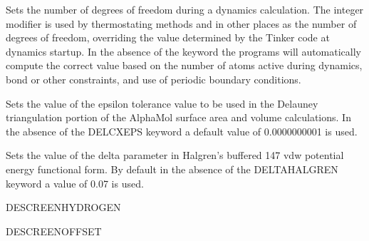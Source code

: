 \documentclass[letterpaper,11pt,english]{sphinxmanual}
\begin{document}
\ignorespaces {}\label{\detokenize{text/keywords:key-degrees-freedom}}\begin{description}
\sphinxAtStartPar
Sets the number of degrees of freedom during a dynamics calculation. The integer modifier is used by thermostating methods and in other places as the number of degrees of freedom, overriding the value determined by the Tinker code at dynamics startup. In the absence of the keyword the programs will automatically compute the correct value based on the number of atoms active during dynamics, bond or other constraints, and use of periodic boundary conditions.

\end{description}

\ignorespaces {}\label{\detokenize{text/keywords:key-delcx-eps}}\begin{description}
\sphinxAtStartPar
Sets the value of the epsilon tolerance value to be used in the Delauney triangulation portion of the AlphaMol surface area and volume calculations. In the absence of the DELCX\sphinxhyphen{}EPS keyword a default value of 0.0000000001 is used.

\end{description}

\ignorespaces {}\label{\detokenize{text/keywords:key-delta-halgren}}\begin{description}
\sphinxAtStartPar
Sets the value of the delta parameter in Halgren’s buffered 14\sphinxhyphen{}7 vdw potential energy functional form. By default in the absence of the DELTA\sphinxhyphen{}HALGREN keyword a value of 0.07 is used.

\end{description}

\ignorespaces {}\label{\detokenize{text/keywords:key-descreen-hydrogen}}
\sphinxAtStartPar
DESCREEN\sphinxhyphen{}HYDROGEN

\ignorespaces {}\label{\detokenize{text/keywords:key-descreen-offset}}
\sphinxAtStartPar
DESCREEN\sphinxhyphen{}OFFSET
\end{document}
